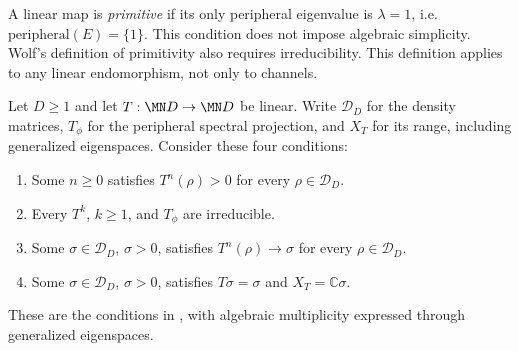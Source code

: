 \begin{definition}\label{def:primitive_channel}
    \leanok
    A linear map is \emph{primitive} if its only peripheral eigenvalue
    is $\lambda = 1$, i.e.\
    $\mathrm{peripheral}(E) = \{1\}$.
    This condition does not impose algebraic simplicity. Wolf's definition
    of primitivity also requires irreducibility.
    This definition applies to any linear endomorphism, not only
    to channels.
\end{definition}

\begin{definition}
    \label{def:wolf_primitive_positive_conditions}
    \leanok
    Let $D\geq1$ and let $T:\MN D\to\MN D$ be linear. Write
    $\mathcal D_D$ for the density matrices, $T_\phi$ for the peripheral
    spectral projection, and $X_T$ for its range, including generalized
    eigenspaces. Consider these four conditions:
    \begin{enumerate}
        \item Some $n\geq0$ satisfies $T^n(\rho)>0$ for every
            $\rho\in\mathcal D_D$.
        \item Every $T^k$, $k\geq1$, and $T_\phi$ are irreducible.
        \item Some $\sigma\in\mathcal D_D$, $\sigma>0$, satisfies
            $T^n(\rho)\to\sigma$ for every $\rho\in\mathcal D_D$.
        \item Some $\sigma\in\mathcal D_D$, $\sigma>0$, satisfies
            $T\sigma=\sigma$ and $X_T=\mathbb C\sigma$.
    \end{enumerate}
    These are the conditions in \cite[Theorem~6.7]{Wolf2012Quantum}, with
    algebraic multiplicity expressed through generalized eigenspaces.
\end{definition}

